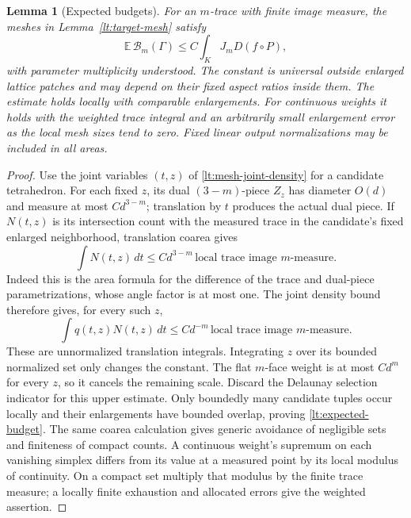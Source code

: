 \documentclass[11pt]{article}
\numberwithin{equation}{section}
\newtheorem{lemma}[theorem]{Lemma}
\theoremstyle{definition}
\theoremstyle{remark}
\begin{document}
\begin{lemma}[Expected budgets]
\label{lt:budget-expectation}
For an $m$-trace with finite image measure, the meshes in
Lemma~\ref{lt:target-mesh} satisfy
\begin{equation}
 \mathbb E\,\mathcal B_m(\Gamma)
             \leq C\int_K J_mD(f\circ P),
 \label{lt:expected-budget}
\end{equation}
with parameter multiplicity understood.  The constant is universal
outside enlarged lattice patches and may depend on their fixed
aspect ratios inside them.  The estimate holds locally with
comparable enlargements.  For continuous weights it holds with
the weighted trace integral and an arbitrarily small enlargement
error as the local mesh sizes tend to zero.  Fixed linear output
normalizations may be included in all areas.
\end{lemma}

\begin{proof}
Use the joint variables $(t,z)$ of
\eqref{lt:mesh-joint-density} for a candidate tetrahedron.
For each fixed $z$, its dual $(3-m)$-piece $Z_z$ has diameter
$O(d)$ and measure at most $Cd^{3-m}$; translation by $t$
produces the actual dual piece.  If $N(t,z)$ is its intersection
count with the measured trace in the candidate's fixed enlarged
neighborhood, translation coarea gives
\[
 \int N(t,z)\,dt
 \leq C d^{3-m}\,
          \text{local trace image $m$-measure}.
\]
Indeed this is the area formula for the difference of the trace
and dual-piece parametrizations, whose angle factor is at most one.
The joint density bound therefore gives, for every such $z$,
\[
 \int q(t,z)N(t,z)\,dt
 \leq C d^{-m}\,
          \text{local trace image $m$-measure}.
\]
These are unnormalized translation integrals.  Integrating $z$
over its bounded normalized set only changes the constant.
The flat $m$-face weight is at most $Cd^m$ for every $z$, so it
cancels the remaining scale.  Discard the Delaunay selection
indicator for this upper estimate.
Only boundedly many candidate tuples occur locally and their
enlargements have bounded overlap, proving
\eqref{lt:expected-budget}.  The same coarea calculation gives
generic avoidance of negligible sets and finiteness of compact
counts.  A continuous weight's supremum on each vanishing simplex
differs from its value at a measured point by its local modulus
of continuity.  On a compact set multiply that modulus by the
finite trace measure; a locally finite exhaustion and allocated
errors give the weighted assertion.
\end{proof}
\end{document}
